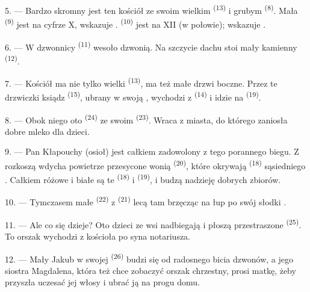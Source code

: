 \VUsaut{3.4mm}
\VUsaut{3.0mm}

5. --- Bardzo skromny jest ten kościół ze swoim wielkim 
\textsuperscript{(13)} i grubym  \textsuperscript{(8)}. Mała
 \textsuperscript{(9)} jest na cyfrze X, wskazuje .
 \textsuperscript{(10)} jest na XII (w połowie); wskazuje .

6. --- W dzwonnicy  \textsuperscript{(11)} wesoło dzwonią. Na szczycie
dachu stoi mały kamienny  \textsuperscript{(12)}.

7. --- Kościół ma nie tylko wielki  \textsuperscript{(13)}, ma też małe
drzwi boczne. Przez te drzwiczki ksiądz  \textsuperscript{(15)},
ubrany w swoją , wychodzi z  \textsuperscript{(14)} i
idzie na  \textsuperscript{(19)}.

8. --- Obok niego oto  \textsuperscript{(24)} ze swoim
 \textsuperscript{(23)}. Wraca z miasta, do którego zaniosła dobre mleko
dla dzieci.

\VUsaut{4.0mm}
\VUsaut{3.4mm}

9. --- Pan Kłapouchy (osioł) jest całkiem zadowolony z tego porannego biegu. Z rozkoszą
wdycha powietrze przesycone wonią  \textsuperscript{(20)}, które
okrywają  \textsuperscript{(18)} sąsiedniego .
Całkiem różowe i białe są te  \textsuperscript{(18)} i
 \textsuperscript{(19)}, i budzą nadzieję dobrych zbiorów.

10. --- Tymczasem małe  \textsuperscript{(22)} z 
\textsuperscript{(21)} lecą tam brzęcząc na łup po swój słodki .

11. --- Ale co się dzieje? Oto dzieci ze wsi nadbiegają i płoszą przestraszone
 \textsuperscript{(25)}. To orszak wychodzi z kościoła po
 syna notariusza.

12. --- Mały Jakub w swojej  \textsuperscript{(26)} budzi się od
radosnego bicia dzwonów, a jego siostra Magdalena, która też chce zobaczyć orszak
chrzestny, prosi matkę, żeby przyszła uczesać jej włosy i ubrać ją na progu domu.

